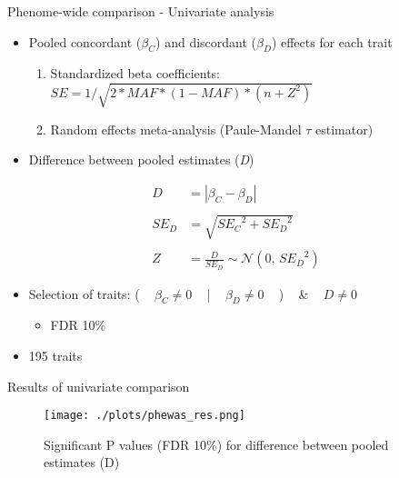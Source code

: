 \documentclass[presentation]{beamer}
\begin{document}
\begin{frame}[label={sec:org0fd4548}]{Phenome-wide comparison - Univariate analysis}
\begin{itemize}
\item Pooled concordant (\(\beta_C\)) and discordant (\(\beta_D\)) effects for each trait
\begin{enumerate}
\item Standardized beta coefficients: ~ \(SE = 1/\sqrt{2 * MAF * (1 - MAF) * (n + Z^2)}\)
\item Random effects meta-analysis (Paule-Mandel \(\tau\) estimator)
\end{enumerate}
\item Difference between pooled estimates (\emph{D})
\end{itemize}
\begin{align*}
D & = |\beta_C - \beta_D|\\
\\
SE_D & = \sqrt{{SE_C}^2 + {SE_D}^2}\\
\\
Z & = \frac{D}{SE_D} \sim \mathcal{N}(0,\,{SE_D}^{2})
\end{align*}
\begin{itemize}
\item Selection of traits: ( ~ \(\beta_C \ne 0\) ~ | ~ \(\beta_D \ne 0\) ~ ) ~ \& ~ \(D \ne 0\)
\begin{itemize}
\item FDR 10\%
\end{itemize}
\item 195 traits
\end{itemize}
\end{frame}
\begin{frame}[label={sec:orgfc05592}]{Results of univariate comparison}
\begin{figure}[htbp]
\centering
\texttt{[image: ./plots/phewas\_res.png]}
\caption{Significant P values (FDR 10\%) for difference between pooled estimates (D)}
\end{figure}
\end{frame}
\end{document}
